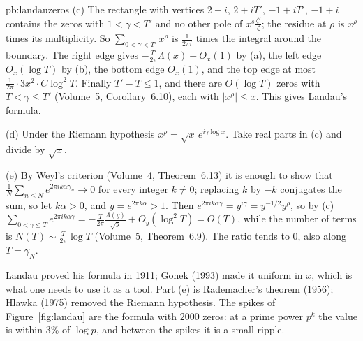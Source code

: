 \begin{solution}{pb:landauzeros}
(c) The rectangle with vertices $2+i$, $2+iT'$, $-1+iT'$, $-1+i$ contains the zeros with $1<\gamma<T'$ and no other pole of $x^s\frac{\zeta'}\zeta$; the residue at $\rho$ is
$x^\rho$ times its multiplicity. So $\sum_{0<\gamma<T'}x^\rho$ is $\frac1{2\pi i}$ times the integral around the boundary. The right edge gives $-\frac{T'}{2\pi}\Lambda(x)+O_x(1)$ by (a), the
left edge $O_x(\log T)$ by (b), the bottom edge $O_x(1)$, and the top edge at most $\frac1{2\pi}\cdot3x^2\cdot C\log^2T$. Finally $T'-T\le1$, and there are $O(\log T)$ zeros with
$T<\gamma\le T'$ (Volume~5, Corollary~6.10), each with $|x^\rho|\le x$. This gives Landau's formula.

(d) Under the Riemann hypothesis $x^\rho=\sqrt x\,e^{i\gamma\log x}$. Take real parts in (c) and divide by $\sqrt x$.

(e) By Weyl's criterion (Volume~4, Theorem~6.13) it is enough to show that $\frac1N\sum_{n\le N}e^{2\pi ik\alpha\gamma_n}\to0$ for every integer $k\ne0$; replacing $k$ by $-k$ conjugates the sum,
so let $k\alpha>0$, and $y=e^{2\pi k\alpha}>1$. Then $e^{2\pi ik\alpha\gamma}=y^{i\gamma}=y^{-1/2}y^\rho$, so by (c)
$\sum_{0<\gamma\le T}e^{2\pi ik\alpha\gamma}=-\frac T{2\pi}\frac{\Lambda(y)}{\sqrt y}+O_y(\log^2T)=O(T)$, while the number of terms is $N(T)\sim\frac T{2\pi}\log T$ (Volume~5, Theorem~6.9).
The ratio tends to $0$, also along $T=\gamma_N$.


\leads Landau proved his formula in 1911; Gonek (1993) made it uniform in $x$, which is what one needs to use it as a tool. Part (e) is Rademacher's theorem (1956); Hlawka (1975)
removed the Riemann hypothesis. The spikes of Figure~\ref{fig:landau} are the formula with $2000$ zeros: at a prime power $p^k$ the value is within $3\%$ of $\log p$, and between the
spikes it is a small ripple.
\end{solution}

